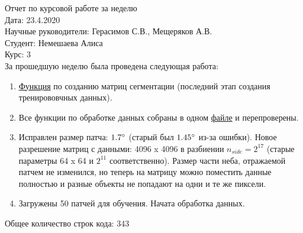 \documentclass{article}
\begin{document}
Отчет по курсовой работе за неделю\\
Дата: 23.4.2020\\
Научные руководители: Герасимов С.В., Мещеряков А.В.\\
Студент: Немешаева Алиса\\
Курс: 3\\

\renewcommand{\labelitemi}{$\blacksquare$}
\renewcommand\labelitemii{$\square$}
За прошедшую неделю была проведена следующая работа:\\
\begin{enumerate}
    \item \href{https://github.com/rt2122/data-segmentation/blob/master/rk/
        find_clusters_in_patch.ipynb}{Функция} по созданию матриц сегментации (последний этап 
        создания тренирововчных данных). \\
    \item Все функции по обработке данных собраны в одном \href{https://github.com/rt2122/
        data-segmentation/blob/master/rk/all_p.py}{файле} и перепроверены.\\
    \item Исправлен размер патча: $1.7 \degree$ (старый был $1.45 \degree$ из-за ошибки). Новое 
        разрешение матриц с данными: 4096 x 4096 в разбиении $n_{side} = 2 ^ {17}$ (старые параметры 
        64 x 64 и $2 ^ {11}$ соответственно). Размер части неба, отражаемой патчем не изменился, но
        теперь на матрицу можно поместить данные полностью и разные объекты не попадают на одни и 
        те же пиксели.\\
    \item Загружены 50 патчей для обучения. Начата обработка данных. \\
\end{enumerate}

Общее количество строк кода: 343\\
\end{document}
